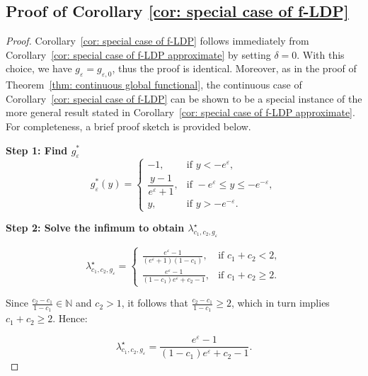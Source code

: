 \documentclass[accepted]{article}
\theoremstyle{plain} %
\theoremstyle{definition}
\theoremstyle{remark}
\newcommand{\eps}{\varepsilon}
\begin{document}
\subsection{Proof of Corollary \ref{cor: special case of f-LDP}}\label{appendix: proof of g_eps}
\begin{proof}

Corollary~\ref{cor: special case of f-LDP} follows immediately from Corollary~\ref{cor: special case of f-LDP approximate} by setting \(\delta = 0\). With this choice, we have \(g_\varepsilon = g_{\varepsilon,0}\), thus the proof is identical.  Moreover, as in the proof of Theorem~\ref{thm: continuous global functional}, the continuous case of Corollary~\ref{cor: special case of f-LDP} can be shown to be a special instance of the more general result stated in Corollary~\ref{cor: special case of f-LDP approximate}. For completeness, a brief proof sketch is provided below.


\textbf{Step 1: Find $g^*_{\eps}$}
\begin{equation}
    g^*_\varepsilon(y) =
    \begin{cases}
        -1, & \text{if } y < -e^{\varepsilon}, \\[6pt]
        \dfrac{y - 1}{e^{\varepsilon} + 1}, & \text{if } -e^{\varepsilon} \leq y \leq -e^{-\varepsilon}, \\[6pt]
        y, & \text{if } y > -e^{-\varepsilon}.
    \end{cases}
\end{equation}




\textbf{Step 2: Solve the infimum to obtain $\lambda^\star_{c_1,c_2,g_\eps}$}

\begin{equation}
    \lambda^\star_{c_1,c_2,g_\eps} =
    \begin{cases}
        \frac{e^\eps - 1}{(e^\eps + 1)(1 - c_1)}, & \text{if } c_1 + c_2 < 2, \\[6pt]
        \frac{e^\eps - 1}{(1 - c_1)e^\eps + c_2 - 1}, & \text{if } c_1 + c_2 \geq 2.
    \end{cases}
\end{equation}

Since $\frac{c_2 - c_1}{1 - c_1} \in \mathbb{N}$ and $c_2 > 1$, it follows that $\frac{c_2 - c_1}{1 - c_1} \geq 2$, which in turn implies  $c_1 + c_2 \geq 2$. Hence:

\[\lambda^\star_{c_1,c_2,g_\eps} = \frac{e^\eps - 1}{(1 - c_1)e^\eps + c_2 - 1}.\]


\end{proof}
\end{document}
